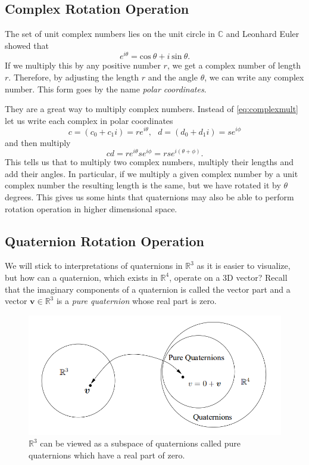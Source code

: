 \subsection{Complex Rotation Operation}
The set of unit complex numbers lies on the unit circle in $\mathbb{C}$ and Leonhard Euler showed that
\begin{equation}
e^{i\theta} = \mbox{cos}~\theta + i~\mbox{sin}~\theta.
\label{eq:euler}
\end{equation}
If we multiply this by any positive number $r$, we get a complex number of length $r$.
Therefore, by adjusting the length $r$ and the angle $\theta$, we can write any complex number.
This form goes by the name \textit{polar coordinates}.

They are a great way to multiply complex numbers. 
Instead of \eqref{eq:complexmult} let us write each complex in polar coordinates
\begin{equation*}
c = (c_0+c_1i) = re^{i\theta}, ~~~d = (d_0+d_1i) = se^{i\phi}
\end{equation*}
and then multiply
\begin{equation*}
cd = re^{i\theta}se^{i\phi} = rse^{i(\theta+\phi)}.
\end{equation*}
This tells us that to multiply two complex numbers, multiply their lengths and add their angles.
In particular, if we multiply a given complex number by a unit complex number the resulting length is the same, but we have rotated it by $\theta$ degrees. 
This gives us some hints that quaternions may also be able to perform rotation operation in higher dimensional space.



\subsection{Quaternion Rotation Operation}
We will stick to interpretations of quaternions in $\mathbb{R}^3$ as it is easier to visualize, but how can a quaternion, which exists in $\mathbb{R}^4$, operate on a 3D vector?
Recall that the imaginary components of a quaternion is called the vector part and a vector $\textbf{v} \in \mathbb{R}^3$ is a \textit{pure quaternion} whose real part is zero.

\begin{figure}[!h]
	\centering
		\includegraphics[width=1.0\textwidth]{figures/r3.png}
	\caption{$\mathbb{R}^3$ can be viewed as a subspace of quaternions called pure quaternions which have a real part of zero.}
	\label{f:r3}
\end{figure}

